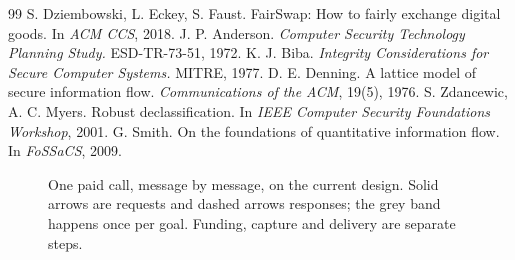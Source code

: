 \documentclass[10pt,a4paper,twocolumn]{article}
\begin{document}
{\begin{thebibliography}{99}
 S. Dziembowski, L. Eckey, S. Faust. FairSwap: How to fairly exchange digital goods. In \emph{ACM CCS}, 2018.
 J. P. Anderson. \emph{Computer Security Technology Planning Study.} ESD-TR-73-51, 1972.
 K. J. Biba. \emph{Integrity Considerations for Secure Computer Systems.} MITRE, 1977.
 D. E. Denning. A lattice model of secure information flow. \emph{Communications of the ACM}, 19(5), 1976.
 S. Zdancewic, A. C. Myers. Robust declassification. In \emph{IEEE Computer Security Foundations Workshop}, 2001.
 G. Smith. On the foundations of quantitative information flow. In \emph{FoSSaCS}, 2009.
\end{thebibliography}
}

\begin{figure}[p]
\centering
\resizebox{\linewidth}{!}{}
\caption{One paid call, message by message, on the current design. Solid arrows are requests and dashed arrows responses; the grey band happens
once per goal. Funding, capture and delivery are separate steps.}
\label{fig:seq}
\end{figure}
\end{document}
